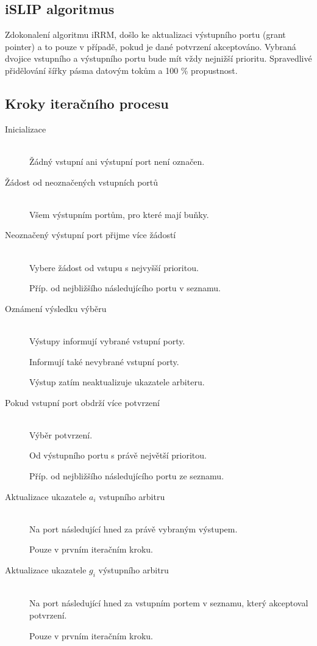 \subsection{iSLIP algoritmus}
Zdokonalení algoritmu iRRM, došlo ke aktualizaci výstupního portu (grant pointer) a to pouze v případě, pokud je dané potvrzení akceptováno. Vybraná dvojice vstupního a výstupního portu bude mít vždy nejnižší prioritu. Spravedlivé přidělování šířky pásma datovým tokům a 100 \% propustnost.
\subsection{Kroky iteračního procesu}
\begin{description}
  \item [Inicializace] \hfill \\
  Žádný vstupní ani výstupní port není označen. \par
  \item [Žádost od neoznačených vstupních portů] \hfill \\
  Všem výstupním portům, pro které mají buňky. \par
  \item [Neoznačený výstupní port přijme více žádostí] \hfill \\
  Vybere žádost od vstupu s nejvyšší prioritou. \par
  Příp. od nejbližšího následujícího portu v seznamu. \par
  \item [Oznámení výsledku výběru] \hfill \\
  Výstupy informují vybrané vstupní porty. \par
  Informují také nevybrané vstupní porty. \par
  Výstup zatím neaktualizuje ukazatele arbiteru. \par
  \item [Pokud vstupní port obdrží více potvrzení] \hfill \\
  Výběr potvrzení. \par
  Od výstupního portu s právě největší prioritou. \par
  Příp. od nejbližšího následujícího portu ze seznamu. \par
  \item [Aktualizace ukazatele $a_i$ vstupního arbitru] \hfill \\
  Na port následující hned za právě vybraným výstupem. \par
  Pouze v prvním iteračním kroku. \par
  \item [Aktualizace ukazatele $g_i$ výstupního arbitru] \hfill \\
  Na port následující hned za vstupním portem v seznamu, který akceptoval potvrzení. \par
  Pouze v prvním iteračním kroku. \par
\end{description}
